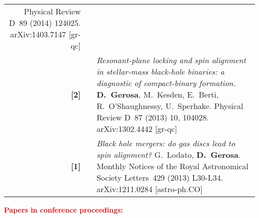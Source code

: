 \documentclass[11pt,a4paper,sans]{moderncv}   %
\newcommand{\mnrasl}{Monthly Notices of the Royal Astronomical Society Letters}
\newcommand{\prd}{Physical Review D}
\begin{document}
{\begin{longtable}{rp{0.3cm}p{15.8cm}}
\newline{}
\prd~89 (2014) 124025. arXiv:1403.7147 [gr-qc]
\vspace{0.05cm}\\
\textbf{[2]} & & \textit{Resonant-plane locking and spin alignment in stellar-mass black-hole binaries: a diagnostic of compact-binary formation.}
\newline{}
\textbf{D.~Gerosa}, M.~Kesden, E.~Berti, R.~O'Shaughnessy, U.~Sperhake. 
\newline{}
\prd~87 (2013) 10, 104028. arXiv:1302.4442 [gr-qc]
\vspace{0.05cm}\\
$\;\;$ \textbf{[1]} & & \textit{Black hole mergers: do gas discs lead to spin alignment?} 
\newline{}
G.~Lodato, \textbf{D.~Gerosa}.
\newline{}
\mnrasl~429 (2013) L30-L34. arXiv:1211.0284 [astro-ph.CO]
\end{longtable}
}
\vspace{-0.1cm}




%



\textcolor{red}{\textbf{Papers in conference proceedings:}}
\vspace{-0.5cm}

\end{document}
